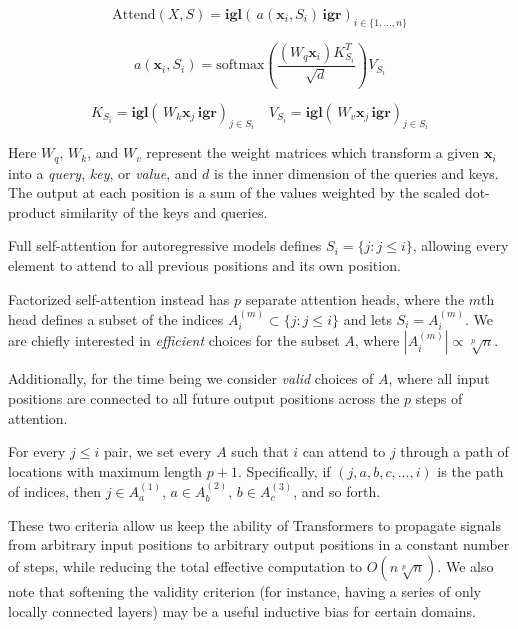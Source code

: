 \begin{equation}\label{attend_fn}
\mathrm{Attend}(X, S) = \mathbf{igl}( \, a(\mathbf{x}_i, S_i) \, \mathbf{igr})_{i \in \{1, ..., n\}}
\end{equation}

\begin{equation}
a(\mathbf{x}_i, S_i) = \mathrm{softmax}\left(\frac{(W_q\mathbf{x}_i)K_{S_i}^T}{\sqrt{d}}\right)V_{S_i}
\end{equation}

\begin{equation}
K_{S_i} = \mathbf{igl}( \, W_k \mathbf{x}_j \, \mathbf{igr})_{j \in S_i} \quad V_{S_i} = \mathbf{igl}( \, W_v \mathbf{x}_j \, \mathbf{igr})_{j \in S_i}
\end{equation}

Here $W_q$, $W_k$, and $W_v$ represent the weight matrices which transform a given $\mathbf{x}_i$ into a \textit{query}, \textit{key}, or \textit{value}, and $d$ is the inner dimension of the queries and keys. The output at each position is a sum of the values weighted by the scaled dot-product similarity of the keys and queries.

Full self-attention for autoregressive models defines $S_i = \{j : j \le i\}$, allowing every element to attend to all previous positions and its own position. 

Factorized self-attention instead has $p$ separate attention heads, where the $m$th head defines a subset of the indices $A_{i}^{(m)} \subset \{j : j \le i\}$ and lets $S_i = A_{i}^{(m)}$.  We are chiefly interested in \textit{efficient} choices for the subset $A$, where $|A_{i}^{(m)}| \propto \sqrt[p]{n}$.

Additionally, for the time being we consider \textit{valid} choices of $A$, where all input positions are connected to all future output positions across the $p$ steps of attention.

For every $j \le i$ pair, we set every $A$ such that $i$ can attend to $j$ through a path of locations with maximum length $p+1$. Specifically, if $(j, a, b, c, ..., i)$ is the path of indices, then $j \in A_{a}^{(1)}$, $a \in A_{b}^{(2)}$, $b \in A_{c}^{(3)}$, and so forth.

These two criteria allow us keep the ability of Transformers to propagate signals from arbitrary input positions to arbitrary output positions in a constant number of steps, while reducing the total effective computation to $O(n \sqrt[p]{n})$. We also note that softening the validity criterion (for instance, having a series of only locally connected layers) may be a useful inductive bias for certain domains.

